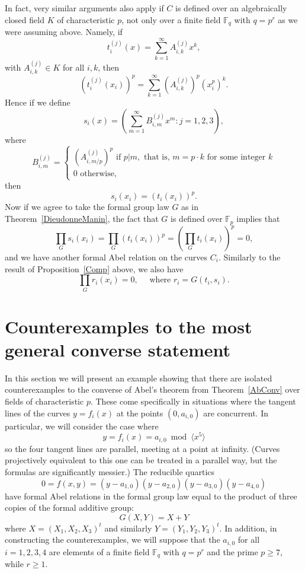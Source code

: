 \documentclass[12pt]{amsart}
\theoremstyle{theorem}
\newcommand{\FF}{\mathbb{F}}
\begin{document}
  In fact, very similar arguments also apply if $C$ is defined over an algebraically closed field $K$ of characteristic $p$, not only over a finite field
 $\FF_q$ with $q = p^r$ as we were assuming above.  Namely, if
 $$t_i^{(j)}(x) = \sum_{k=1}^\infty A_{i,k}^{(j)} x^k,$$
 with $A_{i,k}^{(j)} \in K$ for all $i,k$, then 
 $$(t_i^{(j)}(x_i))^p = \sum_{k=1}^\infty \left(A_{i,k}^{(j)}\right)^p (x_i^p)^k.$$
 Hence if we define
 $$s_i(x) = \left(\sum_{m=1}^\infty B_{i,m}^{(j)} x^m : j = 1,2,3\right),$$
where 
 $$B_{i,m}^{(j)} = \begin{cases} \left(A_{i,m/p}^{(j)}\right)^p \text{ if } p | m, \text{ that is, } m = p\cdot k \text{ for some integer } k \\
                                                       0 \text{ otherwise,}
                           \end{cases}
$$
then 
$$s_i(x_i) = (t_i(x_i))^p.$$
Now if we agree to take the formal group law $G$ as in Theorem~\ref{DieudonneManin}, the fact that
$G$ is defined over $\FF_p$ implies that 
$$\prod_G s_i(x_i) = \prod_G (t_i(x_i))^p = \left(\prod_G t_i(x_i)\right)^p = 0,$$
and we have another formal Abel relation on the curves $C_i$.  Similarly to the result of Proposition~\ref{Comp} above, 
we also have
$$\prod_G r_i(x_i) = 0, \quad \text{ where } r_i = G(t_i,s_i).$$

                           

\section{Counterexamples to the most general converse statement}
\label{CounterEx}

In this section we will present an example showing that there are isolated counterexamples to the 
converse of Abel's theorem from Theorem~\ref{AbConv} over fields of characteristic $p$.  These
come specifically in situations where the
tangent lines of the curves $y = f_i(x)$ at the points $(0,a_{i,0})$ are concurrent.  In particular, 
we will consider the case where 
$$y = f_i(x) = a_{i,0} \bmod \langle x^5\rangle$$
so the four tangent lines are parallel, meeting at a point at infinity.   (Curves projectively 
equivalent to this one can be treated in a parallel way, but the formulas are significantly messier.)
The reducible quartics
\begin{equation}
\label{ReducibleCurve}
0 = f(x,y) = (y - a_{1,0})(y - a_{2,0})(y - a_{3,0})(y - a_{4,0})
\end{equation}
have formal Abel relations in the formal group law equal to the product of three
copies of the formal additive group:
$$G(X,Y) = X + Y$$
where $X = (X_1,X_2,X_3)^t$ and similarly $Y = (Y_1,Y_2,Y_3)^t$.
In addition, in constructing the counterexamples, we will suppose that the
$a_{i,0}$ for all $i = 1,2,3,4$ are elements of a finite field $\FF_q$ with $q = p^r$ 
and the prime $p \ge 7$, while $r \ge 1$.
\end{document}
